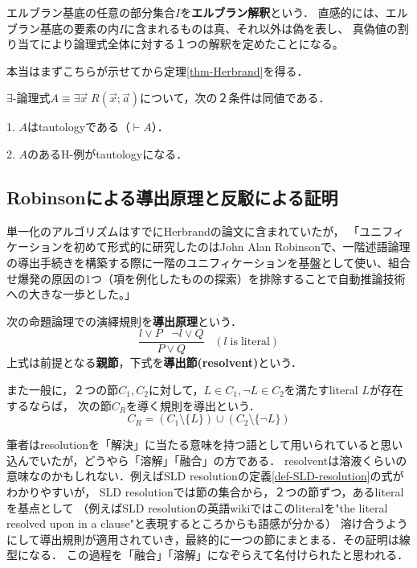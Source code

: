 \documentclass[uplatex, dvipdfmx]{jsreport}
\begin{document}
\begin{definition}
    エルブラン基底の任意の部分集合$I$を\textbf{エルブラン解釈}という．
    直感的には、エルブラン基底の要素の内$I$に含まれるものは真、それ以外は偽を表し、
    真偽値の割り当てにより論理式全体に対する１つの解釈を定めたことになる。
\end{definition}

本当はまずこちらが示せてから定理\ref{thm-Herbrand}を得る．
\begin{theorem}
    $\exists$-論理式$A\equiv\exists\vec{x}\;R(\vec{x};\vec{a})$について，次の２条件は同値である．

    1. $A$はtautologyである（$\vdash A$）．

    2. $A$のあるH-例がtautologyになる．
\end{theorem}

\subsection{Robinsonによる導出原理と反駁による証明}\label{subsection-Robinson}

単一化のアルゴリズムはすでにHerbrandの論文に含まれていたが，
「ユニフィケーションを初めて形式的に研究したのはJohn Alan Robinsonで、一階述語論理の導出手続きを構築する際に一階のユニフィケーションを基盤として使い、組合せ爆発の原因の1つ（項を例化したものの探索）を排除することで自動推論技術への大きな一歩とした。」


\begin{definition}[導出：命題論理]
    次の命題論理での演繹規則を\textbf{導出原理}という．
    \[ \frac{l\lor P\;\;\;\lnot l\lor Q}{P\lor Q}\;\;\;(l\mathrm{\;is\;literal}) \]
    上式は前提となる\textbf{親節}，下式を\textbf{導出節(resolvent)}という．

    また一般に，２つの節$C_1,C_2$に対して，$L\in C_1,\lnot L\in C_2$を満たすliteral $L$が存在するならば，
    次の節$C_R$を導く規則を導出という．
    \[ C_R = (C_1\setminus\{L\})\cup(C_2\setminus\{\lnot L\}) \]
\end{definition}
\begin{remark}
    筆者はresolutionを「解決」に当たる意味を持つ語として用いられていると思い込んでいたが，どうやら「溶解」「融合」の方である．
    resolventは溶液くらいの意味なのかもしれない．例えばSLD resolutionの定義\ref{def-SLD-resolution}の式がわかりやすいが，
    SLD resolutionでは節の集合から，２つの節ずつ，あるliteralを基点として
    （例えばSLD resolutionの英語wikiではこのliteralを"the literal resolved upon in a clause"と表現するところからも語感が分かる）
    溶け合うようにして導出規則が適用されていき，最終的に一つの節にまとまる．その証明は線型になる．
    この過程を「融合」「溶解」になぞらえて名付けられたと思われる．
\end{remark}
\end{document}
